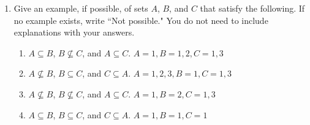 \documentclass{article}
\begin{document}
{\begin{enumerate}[labelindent=0pt,leftmargin=0pt]
Proof: By contradiction assume there does not exist nonzero rational numbers a, b, and c such that $a\sqrt{2} + b\sqrt{3} = c$.
We can rewrite as $a\sqrt{2} =c - b\sqrt{3}$.
Multiplying both sides by $sqrt{2}$ we can rewrite as 
$2a =c\sqrt{2} - b\sqrt{6}$.
We know$2a$ is rational as a is rational by our assumptions. 
Given that $\sqrt{2}$ is irrational implies $c\sqrt{2}$ is irrational which implies 
$c\sqrt{2} - b\sqrt{6}$ is irrational given an irrational number minus a rational or irrational number is irrational.  
This implies that $a\sqrt{2} + b\sqrt{3} = c$. is a false statement and is a contradiction. 
Thus our initial assumption that there exist nonzero rational numbers $a$, $b$, and $c$ such that $a\sqrt{2} + b\sqrt{3} = c$ must be false, and there do not exist such rational numbers $a$, $b$, and $c$.

\item Give an example, if possible, of sets $A$, $B$, and $C$ that
satisfy the following. If no example exists, write ``Not possible." You do
not need to include explanations with your answers.
\begin{enumerate}
\item $A\subseteq B$, $B\not\subseteq C$, and $A\subseteq C$.
\subitem $A = {{1}}, B = {1, 2}, C = {1, 3}$
\item $A\not\subseteq B$, $B\subseteq C$, and $C\subseteq A$.
\subitem $A = {1,2,3}, B = {1}, C = {1, 3}$
\item $A\not\subseteq B$, $B\not\subseteq C$, and $A\subseteq C$.
\subitem $A = {1}, B = {2}, C = {1, 3}$
\item $A\subseteq B$, $B\subseteq C$, and $C\subseteq A$.
\subitem $A = {1}, B = {1}, C = {1}$
\end{enumerate}
\end{enumerate}
}
\end{document}
